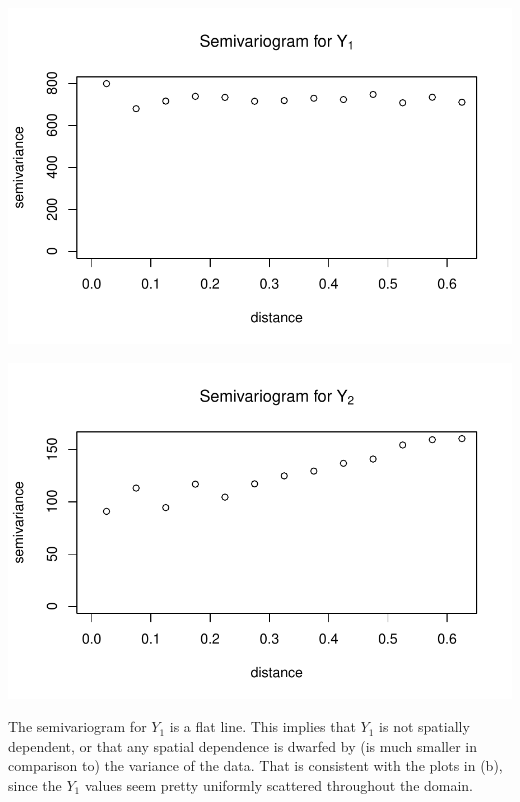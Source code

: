 \documentclass[letterpaper, 12pt]{article}\usepackage[]{graphicx}\usepackage[]{color}
\makeatletter
\def\maxwidth{ %
  \ifdim\Gin@nat@width>\linewidth
    \linewidth
  \else
    \Gin@nat@width
  \fi
}
\newenvironment{knitrout}{}{} %
\makeatother
\begin{document}
\begin{enumerate}[(a)]
\begin{knitrout}
\color{fgcolor}
\includegraphics[width=\maxwidth]{figure/unnamed-chunk-1} 

\end{knitrout}

\begin{knitrout}
\color{fgcolor}
\includegraphics[width=\maxwidth]{figure/unnamed-chunk-2} 

\end{knitrout}


{\sf
The semivariogram for $Y_1$ is a flat line. This implies that $Y_1$ is not spatially dependent, or that any spatial dependence is dwarfed by (is much smaller in comparison to) the variance of the data. That is consistent with the plots in (b), since the $Y_1$ values seem pretty uniformly scattered throughout the domain.
 
}
\end{enumerate}
\end{document}

